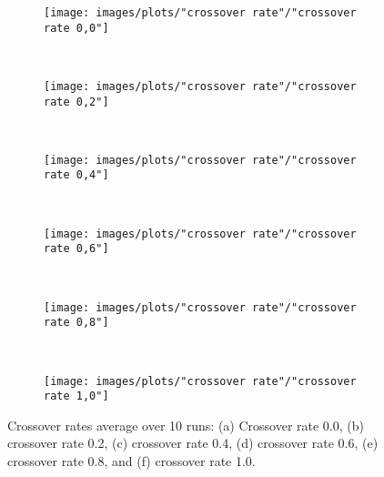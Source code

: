 \begin{figure}[h!]
    \centering
    \begin{subfigure}[b]{0.31\textwidth}
        \texttt{[image: images/plots/"crossover rate"/"crossover rate 0,0"]}
        \caption{}
        \hfill
        \label{plot:crossover rate 0.0}
    \end{subfigure}
    ~
    \begin{subfigure}[b]{0.31\textwidth}
        \texttt{[image: images/plots/"crossover rate"/"crossover rate 0,2"]}
        \caption{}
        \hfill
        \label{plot:crossover rate 0.2}
    \end{subfigure}
    ~
       \begin{subfigure}[b]{0.31\textwidth}
        \texttt{[image: images/plots/"crossover rate"/"crossover rate 0,4"]}
        \caption{}
        \hfill
        \label{plot:crossover rate 0.4}
    \end{subfigure}
    ~
       \begin{subfigure}[b]{0.31\textwidth}
        \texttt{[image: images/plots/"crossover rate"/"crossover rate 0,6"]}
        \caption{}
        \hfill
        \label{plot:crossover rate 0.6}
    \end{subfigure}
    ~
       \begin{subfigure}[b]{0.31\textwidth}
        \texttt{[image: images/plots/"crossover rate"/"crossover rate 0,8"]}
        \caption{}
        \hfill
        \label{plot:crossover rate 0.8}
    \end{subfigure}
    ~
    \begin{subfigure}[b]{0.31\textwidth}
        \texttt{[image: images/plots/"crossover rate"/"crossover rate 1,0"]}
        \caption{}
        \hfill
        \label{plot:crossover rate 1.0}
    \end{subfigure}
    \caption{Crossover rates average over 10 runs: (a) Crossover rate 0.0, (b) crossover rate 0.2, (c) crossover rate 0.4, (d) crossover rate 0.6, (e) crossover rate 0.8, and (f) crossover rate 1.0.}
    \label{plot:crossover rates}
\end{figure}


